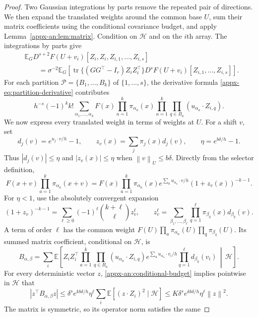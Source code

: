 \documentclass[11pt,letterpaper]{article}
\theoremstyle{remark}
\newcommand{\E}{\mathbb E}
\newcommand{\tr}{\operatorname{tr}}
\newcommand{\norm}[1]{\left\lVert#1\right\rVert}
\begin{document}
\begin{proof}
Two Gaussian integrations by parts remove the repeated pair of
directions. We then expand the translated weights around the common
base \(U\), sum their matrix coefficients using the conditional
covariance budget, and apply Lemma~\ref{appx-an:lem:matrix}.
Condition on \(\mathcal H\) and on the \(i\)th array. The integrations
by parts give
\begin{align*}
 &\E_G D^{s+2}F(U+v_i)[Z_i,Z_i,Z_{i,1},\ldots,Z_{i,s}]\\
 &\qquad=\sigma^{-2}\E_G\left[
    \tr\{(GG^\top-I_r)Z_iZ_i^\top\}
    D^sF(U+v_i)[Z_{i,1},\ldots,Z_{i,s}]\right].
\end{align*}
For each partition \(\mathcal P=\{B_1,\ldots,B_k\}\) of
\(\{1,\ldots,s\}\), the derivative formula
\eqref{appx-eq:partition-derivative} contributes
\[
 h^{-s}(-1)^kk!\sum_{\alpha_1,\ldots,\alpha_k}
 F(x)\prod_{a=1}^k\pi_{\alpha_a}(x)
 \prod_{a=1}^k\prod_{q\in B_a}(u_{\alpha_a}\cdot Z_{i,q}).
\]
We now express every translated weight in terms of weights at \(U\).
For a shift \(v\), set
\[
 d_j(v)=e^{u_j\cdot v/h}-1,
 \qquad z_v(x)=\sum_j\pi_j(x)d_j(v),
 \qquad \eta=e^{b\delta/h}-1.
\]
Thus \(|d_j(v)|\le\eta\) and \(|z_v(x)|\le\eta\) when
\(\norm{v}_U\le b\delta\).  Directly from the selector definition,
\begin{equation}
 F(x+v)\prod_{a=1}^k\pi_{\alpha_a}(x+v)
 =F(x)\prod_{a=1}^k\pi_{\alpha_a}(x)
    e^{\sum_a u_{\alpha_a}\cdot v/h}
                    (1+z_v(x))^{-k-1}.
 \label{appx-an:weight-translation}
\end{equation}
For \(\eta<1\), use the absolutely convergent expansion
\[
 (1+z_v)^{-k-1}
 =\sum_{\ell\ge0}(-1)^\ell\binom{k+\ell}{\ell}z_v^\ell,
 \qquad
 z_v^\ell=\sum_{\beta_1,\ldots,\beta_\ell}
                \prod_{q=1}^\ell\pi_{\beta_q}(x)d_{\beta_q}(v).
\]
A term of order \(\ell\) has the common weight
\(F(U)\prod_a\pi_{\alpha_a}(U)\prod_q\pi_{\beta_q}(U)\).
Its summed matrix coefficient, conditional on \(\mathcal H\), is
\[
 B_{\alpha,\beta}=\sum_i\E\left[
  Z_iZ_i^\top
  \prod_{a=1}^k\prod_{q\in B_a}(u_{\alpha_a}\cdot Z_{i,q})
  e^{\sum_a u_{\alpha_a}\cdot v_i/h}
  \prod_{q=1}^\ell d_{\beta_q}(v_i)
       \,\middle|\,\mathcal H\right].
\]
For every deterministic vector \(z\),
\eqref{appx-an:conditional-budget} implies pointwise in \(\mathcal H\)
that
\[
 |z^\top B_{\alpha,\beta}z|
 \le\delta^se^{kb\delta/h}\eta^\ell
               \sum_i\E[(z\cdot Z_i)^2\mid\mathcal H]
 \le K\delta^se^{kb\delta/h}\eta^\ell\norm{z}^2.
\]
The matrix is symmetric, so its operator norm satisfies the same

\end{proof}
\end{document}
